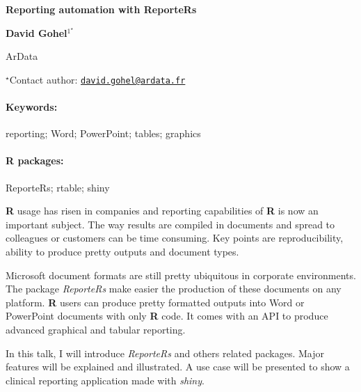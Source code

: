 \documentclass[11pt, a4paper]{article}
\renewcommand{\title}[1]{\begin{center}{\bf \LARGE #1}\end{center}}
\newcommand{\keywords}{\paragraph{Keywords:}}
\newcommand{\packages}{\paragraph{R packages:}}
\begin{document}
\pagestyle{empty}

\title{Reporting automation with ReporteRs}

\begin{center}
  {\bf David Gohel$^{1^\star}$}
\end{center}

\vskip 0.3cm

\begin{affiliations}
\begin{enumerate}
\begin{minipage}{0.915\textwidth}
\centering
\item ArData \\[-2pt]
\end{minipage}
\end{enumerate}
$^\star$Contact author: \href{mailto:david.gohel@ardata.fr}{\nolinkurl{david.gohel@ardata.fr}}\\
\end{affiliations}

\vskip 0.5cm

\begin{minipage}{0.915\textwidth}
\keywords reporting; Word; PowerPoint; tables; graphics
\packages ReporteRs; rtable; shiny
\end{minipage}

\vskip 0.8cm

\textbf{R} usage has risen in companies and reporting capabilities of
\textbf{R} is now an important subject. The way results are compiled in
documents and spread to colleagues or customers can be time consuming.
Key points are reproducibility, ability to produce pretty outputs and
document types.

Microsoft document formats are still pretty ubiquitous in corporate
environments. The package \emph{ReporteRs} make easier the production of
these documents on any platform. \textbf{R} users can produce pretty
formatted outputs into Word or PowerPoint documents with only \textbf{R}
code. It comes with an API to produce advanced graphical and tabular
reporting.

In this talk, I will introduce \emph{ReporteRs} and others related
packages. Major features will be explained and illustrated. A use case
will be presented to show a clinical reporting application made with
\emph{shiny}.
\end{document}
